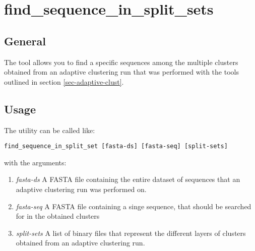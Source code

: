 \section{find\_sequence\_in\_split\_sets}

\subsection{General}

The tool allows you to find a specific sequences among the multiple clusters
obtained from an adaptive clustering run that was performed with the
tools outlined in section \ref{sec-adaptive-clust}.

\subsection{Usage}

The utility can be called like:
\begin{lstlisting}
find_sequence_in_split_set [fasta-ds] [fasta-seq] [split-sets]
\end{lstlisting}
with the arguments:
\begin{enumerate}
  \item \emph{fasta-ds} A FASTA file containing the entire dataset of
    sequences that an adaptive clustering run was performed on.
  \item \emph{fasta-seq} A FASTA file containing a singe sequence,
    that should be searched for in the obtained clusters
  \item \emph{split-sets} A list of binary files that represent the
    different layers of clusters obtained from an adaptive clustering
    run.
\end{enumerate}

